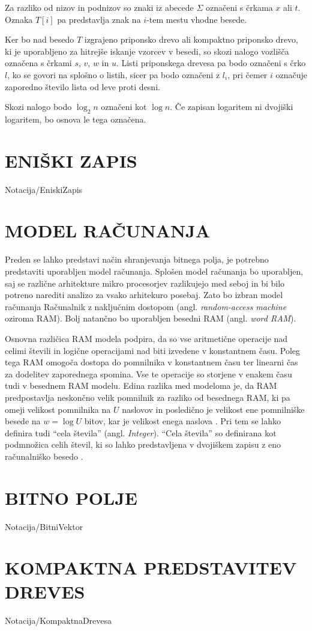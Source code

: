 Za razliko od nizov in podnizov so znaki iz abecede $\Sigma$ označeni s črkama $x$ ali $t$. Oznaka $T[i]$ pa predstavlja znak na $i$-tem mestu vhodne besede.

Ker bo nad besedo $T$ izgrajeno priponsko drevo ali kompaktno priponsko drevo, ki je uporabljeno za hitrejše iskanje vzorcev v besedi, so skozi nalogo vozlišča označena s črkami $s$, $v$, $w$ in $u$. Listi priponskega drevesa pa bodo označeni s črko $l$, ko se govori na splošno o listih, sicer pa bodo označeni z $l_i$, pri čemer $i$ označuje zaporedno število lista od leve proti desni.

Skozi nalogo bodo $\log_2{n}$ označeni kot $\log{n}$. Če zapisan logaritem ni dvojiški logaritem, bo osnova le tega označena.


\section{ENIŠKI ZAPIS}\label{sec:Eniski_Zapis}
{Notacija/EniskiZapis}

\section{MODEL RAČUNANJA}\label{sec:Model_racunanja}
Preden se lahko predstavi način shranjevanja bitnega polja, je potrebno predstaviti uporabljen model računanja. Splošen model računanja bo uporabljen, saj se različne arhitekture mikro procesorjev razlikujejo med seboj in bi bilo potreno narediti analizo za vsako arhitekuro posebaj. Zato bo izbran model računanja Računalnik z naključnim dostopom (angl. \textit{random-access machine} oziroma RAM). Bolj natančno bo uporabljen besedni RAM  (angl. \textit{word RAM}).

Osnovna različica RAM modela podpira, da so vse aritmetične operacije nad celimi števili in logične operacijami nad biti izvedene v konstantnem času. Poleg tega RAM omogoča dostopa do pomnilnika v konstantnem času ter linearni čas za dodelitev zaporednega spomina. Vse te operacije so storjene v enakem času tudi v besednem RAM modelu. Edina razlika med modeloma je, da RAM predpostavlja neskončno velik pomnilnik za razliko od besednega RAM, ki pa omeji velikost pomnilnika na $U$ naslovov in posledično je velikost ene pomnilniške besede na $w=\log{U}$ bitov, kar je velikost enega naslova \cite{Fredman1990,Morin2013,Navarro2016}. Pri tem se lahko definira tudi \enquote{cela števila} (angl. \textit{Integer}). \enquote{Cela števila} so definirana kot podmnožica celih števil, ki so lahko predstavljena v dvojiškem zapisu z eno računalniško besedo \cite{Navarro2016}.

\section{BITNO POLJE}\label{sec:Bitno_Polje}
{Notacija/BitniVektor}


\section{KOMPAKTNA PREDSTAVITEV DREVES}\label{sec:kompaktna_drevesa}
{Notacija/KompaktnaDrevesa}